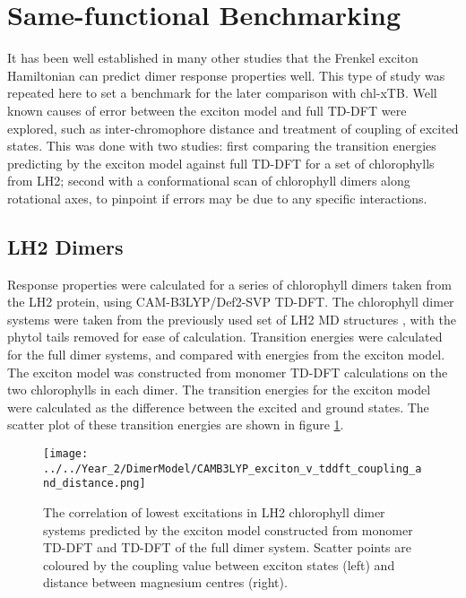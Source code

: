 \section{Same-functional Benchmarking}
\label{sec:exction_v_full_dimer}

It has been well established in many other studies that the Frenkel exciton Hamiltonian
can predict dimer response properties well. This type of study was repeated here
to set a benchmark for the later comparison with chl-xTB. Well known causes of error
between the exciton model and full TD-DFT were explored, such as inter-chromophore
distance and treatment of coupling of excited states. This was done with two studies:
first comparing the transition energies predicting by the exciton model against 
full TD-DFT for a set of chlorophylls from LH2; second with a conformational scan
of chlorophyll dimers along rotational axes, to pinpoint if errors may be due to
any specific interactions.

\subsection{LH2 Dimers}
\label{subsec:LH2_exciton_camb3lyp}

Response properties were calculated for a series of chlorophyll dimers taken from
the LH2 protein, using CAM-B3LYP/Def2-SVP TD-DFT. The chlorophyll dimer systems
were taken from the previously used set of LH2 MD structures \cite{Stross2016},
with the phytol tails removed for ease of calculation. Transition energies were
calculated for the full dimer systems, and compared with energies from the exciton 
model. The exciton model was constructed from monomer TD-DFT calculations on the
two chlorophylls in each dimer. The transition energies for the exciton model were
calculated as the difference between the excited and ground states. The scatter
plot of these transition energies are shown in figure \ref{fig:camb3lyp_excitons}. 

\begin{figure}
    \centering
    \texttt{[image: ../../Year\_2/DimerModel/CAMB3LYP\_exciton\_v\_tddft\_coupling\_and\_distance.png]}
    \label{fig:camb3lyp_excitons}
    \caption{The correlation of lowest excitations in LH2 chlorophyll dimer systems
    predicted by the exciton model constructed from monomer TD-DFT and TD-DFT of
    the full dimer system. Scatter points are coloured by the coupling value between
    exciton states (left) and distance between magnesium centres (right).}
\end{figure}

